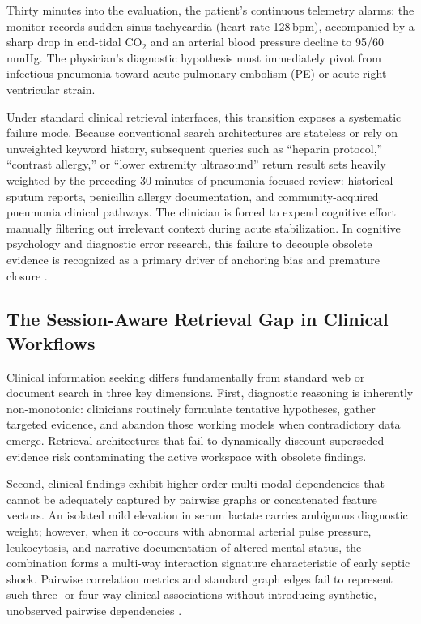 \documentclass[12pt]{article}
\begin{document}
Thirty minutes into the evaluation, the patient's continuous telemetry alarms: the monitor records sudden sinus tachycardia (heart rate 128\,bpm), accompanied by a sharp drop in end-tidal $\text{CO}_2$ and an arterial blood pressure decline to 95/60\,mmHg. The physician's diagnostic hypothesis must immediately pivot from infectious pneumonia toward acute pulmonary embolism (PE) or acute right ventricular strain.

Under standard clinical retrieval interfaces, this transition exposes a systematic failure mode. Because conventional search architectures are stateless or rely on unweighted keyword history, subsequent queries such as ``heparin protocol,'' ``contrast allergy,'' or ``lower extremity ultrasound'' return result sets heavily weighted by the preceding 30 minutes of pneumonia-focused review: historical sputum reports, penicillin allergy documentation, and community-acquired pneumonia clinical pathways. The clinician is forced to expend cognitive effort manually filtering out irrelevant context during acute stabilization. In cognitive psychology and diagnostic error research, this failure to decouple obsolete evidence is recognized as a primary driver of anchoring bias and premature closure \cite{croskerry2002achieving,goddard2012automation}.

\subsection*{The Session-Aware Retrieval Gap in Clinical Workflows}

Clinical information seeking differs fundamentally from standard web or document search in three key dimensions. First, diagnostic reasoning is inherently non-monotonic: clinicians routinely formulate tentative hypotheses, gather targeted evidence, and abandon those working models when contradictory data emerge. Retrieval architectures that fail to dynamically discount superseded evidence risk contaminating the active workspace with obsolete findings.

Second, clinical findings exhibit higher-order multi-modal dependencies that cannot be adequately captured by pairwise graphs or concatenated feature vectors. An isolated mild elevation in serum lactate carries ambiguous diagnostic weight; however, when it co-occurs with abnormal arterial pulse pressure, leukocytosis, and narrative documentation of altered mental status, the combination forms a multi-way interaction signature characteristic of early septic shock. Pairwise correlation metrics and standard graph edges fail to represent such three- or four-way clinical associations without introducing synthetic, unobserved pairwise dependencies \cite{feng2019hypergraph,zhou2006learning}.
\end{document}
